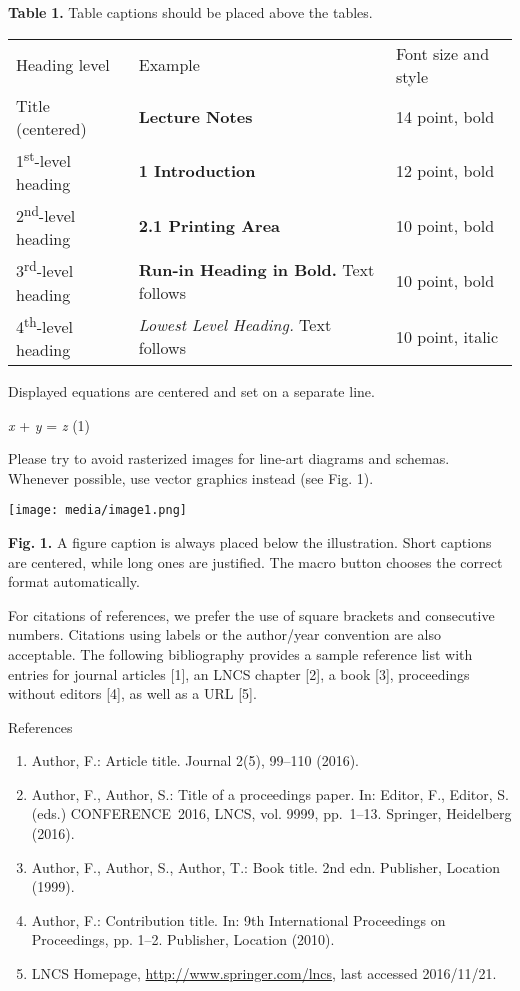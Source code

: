 \textbf{Table} \textbf{1.} Table captions should be placed above the
tables.

\begin{longtable}[]{@{}lll@{}}
\toprule
\endhead
Heading level & Example & Font size and style\tabularnewline
Title (centered) & \textbf{Lecture Notes} & 14 point,
bold\tabularnewline
1\textsuperscript{st}-level heading & \textbf{1 Introduction} & 12
point, bold\tabularnewline
2\textsuperscript{nd}-level heading & \textbf{2.1 Printing Area} & 10
point, bold\tabularnewline
3\textsuperscript{rd}-level heading & \textbf{Run-in Heading in Bold.}
Text follows & 10 point, bold\tabularnewline
4\textsuperscript{th}-level heading & \emph{Lowest Level Heading.} Text
follows & 10 point, italic\tabularnewline
\bottomrule
\end{longtable}

Displayed equations are centered and set on a separate line.

\emph{x} + \emph{y} = \emph{z} (1)

Please try to avoid rasterized images for line-art diagrams and schemas.
Whenever possible, use vector graphics instead (see Fig. 1).

\texttt{[image: media/image1.png]}

\textbf{Fig.} \textbf{1.} A figure caption is always placed below the
illustration. Short captions are centered, while long ones are
justified. The macro button chooses the correct format automatically.

For citations of references, we prefer the use of square brackets and
consecutive numbers. Citations using labels or the author/year
convention are also acceptable. The following bibliography provides a
sample reference list with entries for journal articles {[}1{]}, an LNCS
chapter {[}2{]}, a book {[}3{]}, proceedings without editors {[}4{]}, as
well as a URL {[}5{]}.

References

\begin{enumerate}
\def\labelenumi{\arabic{enumi}.}
\item
  Author, F.: Article title. Journal 2(5), 99--110 (2016).
\item
  Author, F., Author, S.: Title of a proceedings paper. In: Editor, F.,
  Editor, S. (eds.) CONFERENCE~2016, LNCS, vol. 9999, pp.~1--13.
  Springer, Heidelberg (2016).
\item
  Author, F., Author, S., Author, T.: Book title. 2nd edn. Publisher,
  Location (1999).
\item
  Author, F.: Contribution title. In: 9th International Proceedings on
  Proceedings, pp. 1--2. Publisher, Location (2010).
\item
  LNCS Homepage, \url{http://www.springer.com/lncs}, last accessed
  2016/11/21.
\end{enumerate}
